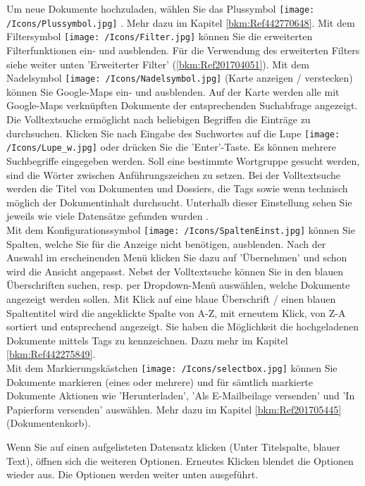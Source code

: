 Um neue Dokumente hochzuladen, wählen Sie das Plussymbol \texttt{[image: /Icons/Plussymbol.jpg]} . Mehr dazu im Kapitel \ref{bkm:Ref442770648}. Mit dem Filtersymbol \texttt{[image: /Icons/Filter.jpg]}  können Sie die erweiterten Filterfunktionen ein- und ausblenden. Für die Verwendung des erweiterten Filters siehe weiter unten 'Erweiterter Filter' (\ref{bkm:Ref201704051}). Mit dem Nadelsymbol \texttt{[image: /Icons/Nadelsymbol.jpg]} (Karte anzeigen / verstecken) können Sie Google-Maps ein- und ausblenden. Auf der Karte werden alle mit Google-Maps verknüpften Dokumente der entsprechenden Suchabfrage angezeigt. Die Volltextsuche  ermöglicht nach beliebigen Begriffen die Einträge zu durchsuchen. Klicken Sie nach Eingabe des Suchwortes auf die Lupe \texttt{[image: /Icons/Lupe\_w.jpg]}  oder drücken Sie die 'Enter'-Taste. Es können mehrere Suchbegriffe eingegeben werden. Soll eine bestimmte Wortgruppe gesucht werden, sind die Wörter zwischen Anführungszeichen zu setzen. Bei der Volltextsuche werden die Titel von Dokumenten und Dossiers, die Tags sowie wenn technisch möglich der Dokumentinhalt durchsucht.  Unterhalb dieser Einstellung sehen Sie jeweils wie viele Datensätze gefunden wurden .\\
Mit dem Konfigurationssymbol \texttt{[image: /Icons/SpaltenEinst.jpg]}  können Sie Spalten, welche Sie für die Anzeige nicht benötigen, ausblenden. Nach der Auswahl im erscheinenden Menü klicken Sie dazu auf 'Übernehmen' und schon wird die Ansicht angepasst. \newline
  \newline
Nebst der Volltextsuche können Sie in den blauen Überschriften  suchen, resp. per Dropdown-Menü auswählen, welche Dokumente angezeigt werden sollen. Mit Klick auf eine blaue Überschrift / einen blauen Spaltentitel wird die angeklickte Spalte von A-Z, mit erneutem Klick, von Z-A sortiert und entsprechend angezeigt. \newline
Sie haben die Möglichkeit die hochgeladenen Dokumente mittels Tags  zu kennzeichnen. Dazu mehr im Kapitel \ref{bkm:Ref442275849}. \\
Mit dem Markierungskästchen \texttt{[image: /Icons/selectbox.jpg]}  können Sie Dokumente markieren (eines oder mehrere) und für sämtlich markierte Dokumente Aktionen wie 'Herunterladen', 'Als E-Mailbeilage versenden' und 'In Papierform versenden' auswählen. Mehr dazu im Kapitel \ref{bkm:Ref201705445} (Dokumentenkorb).

Wenn Sie auf einen aufgelisteten Datensatz klicken  (Unter Titelspalte, blauer Text), öffnen sich die weiteren Optionen. Erneutes Klicken blendet die Optionen wieder aus. Die Optionen werden weiter unten ausgeführt.

